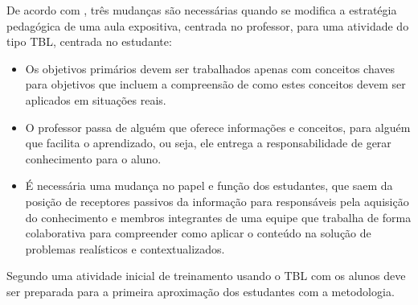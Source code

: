 De acordo com \cite{bollela}, três mudanças são necessárias quando se modifica a estratégia pedagógica de uma aula expositiva, centrada no professor, para uma atividade do tipo TBL, centrada no estudante:

\begin{itemize}
  \item Os objetivos primários devem ser trabalhados apenas com conceitos chaves para objetivos que incluem a compreensão de como estes conceitos devem ser aplicados em situações reais.
  \item O professor passa de alguém que oferece informações e conceitos, para alguém que facilita o aprendizado, ou seja, ele entrega a responsabilidade de gerar conhecimento para o aluno.
  \item É necessária uma mudança no papel e função dos estudantes, que saem da posição de receptores passivos da informação para responsáveis pela aquisição do conhecimento e membros integrantes de uma equipe que trabalha de forma colaborativa para compreender como aplicar o conteúdo na solução de problemas realísticos e contextualizados.
\end{itemize}

Segundo \cite{bollela} uma atividade inicial de treinamento usando o TBL com os alunos deve ser preparada para a primeira aproximação dos estudantes com a metodologia.
